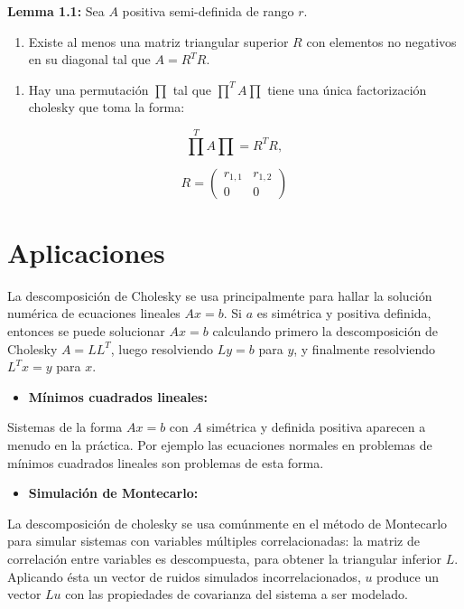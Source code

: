 \documentclass[10pt, oneside,spanish]{article}
\begin{document}
\textbf{Lemma 1.1:}
Sea \(A\) positiva semi-definida de rango \(r\).

\begin{enumerate}
\item Existe al menos una matriz triangular superior \(R\) con elementos no negativos en su diagonal tal que \(A = R^TR\).
\end{enumerate} 

\begin{enumerate}
\item Hay una permutación $\prod$ tal que $\prod^TA\prod$ tiene una única factorización cholesky que toma la forma: 
\end{enumerate}

\begin{equation}
\prod^TA\prod = R^TR ,
\end{equation}

\[
R = 
 \begin{pmatrix}
  r_{1,1} & r_{1,2} \\
  0 & 0
 \end{pmatrix}
\]

\section{Aplicaciones}
La descomposición de Cholesky se usa principalmente para hallar la solución numérica de ecuaciones lineales $Ax = b$. Si $a$ es simétrica y positiva definida, entonces se puede solucionar $Ax = b$ calculando primero la descomposición de Cholesky $A = LL^T$, luego resolviendo $Ly = b$ para $y$, y finalmente resolviendo $L^Tx = y$ para $x$.

\begin{itemize}
\item \textbf{Mínimos cuadrados lineales:}
\end{itemize}

Sistemas de la forma $Ax =b$ con $A$ simétrica y definida positiva aparecen a menudo en la práctica. Por ejemplo las ecuaciones normales en problemas de mínimos cuadrados lineales son problemas de esta forma. 

\begin{itemize}
\item \textbf{Simulación de Montecarlo:}
\end{itemize}

La descomposición de cholesky se usa comúnmente en el método de Montecarlo para simular sistemas con variables múltiples correlacionadas: la matriz de correlación entre variables es descompuesta, para obtener la triangular inferior $L$. Aplicando ésta un vector de ruidos simulados incorrelacionados, $u$ produce un vector $Lu$ con las propiedades de covarianza del sistema a ser modelado.
\end{document}
